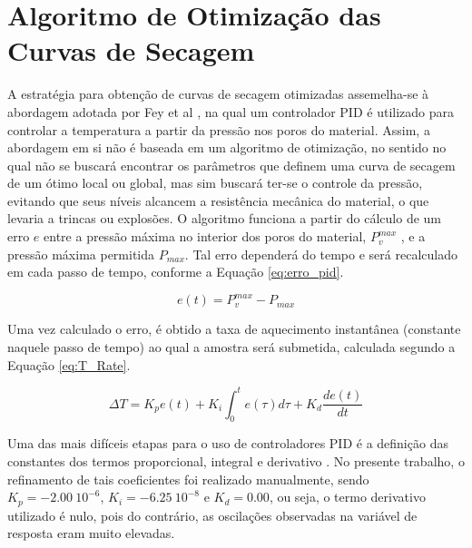 \section{Algoritmo de Otimização das Curvas de Secagem}\label{mat:pid}
A estratégia para obtenção de curvas de secagem otimizadas assemelha-se à
abordagem adotada por Fey et al \cite{Fey2017c}, na qual um controlador PID é
utilizado para controlar a temperatura a partir da pressão nos poros do
material. Assim, a abordagem em si não é baseada em um algoritmo de otimização,
no sentido no qual não se buscará encontrar os parâmetros que definem uma curva
de secagem de um ótimo local ou global, mas sim buscará ter-se o controle da
pressão, evitando que seus níveis alcancem a resistência mecânica do material, o
que levaria a trincas ou explosões. O algoritmo funciona a partir do cálculo de
um erro $e$ entre a pressão máxima no interior dos poros do material,
$P_v^{max}$ , e a pressão máxima permitida $P_{max}$. Tal erro dependerá do
tempo e será recalculado em cada passo de tempo, conforme a Equação
\ref{eq:erro_pid}.

\begin{equation}
  \label{eq:erro_pid}
  e(t) = P_v^{max} - P_{max}
\end{equation}

Uma vez calculado o erro, é obtido a taxa de aquecimento instantânea (constante
naquele passo de tempo) ao qual a amostra será submetida, calculada segundo a
Equação \ref{eq:T_Rate}.

\begin{equation}
  \label{eq:T_Rate}
  \Delta T = K_{p} e(t)+K_{i} \int_{0}^{t} e(\tau) d \tau+K_{d} \frac{d e(t)}{d t}
\end{equation}

Uma das mais difíceis etapas para o uso de controladores PID é a definição das
constantes dos termos proporcional, integral e derivativo \cite{ogata2002}. No
presente trabalho, o refinamento de tais coeficientes foi realizado manualmente,
sendo $K_p = - 2.00 \ 10^{-6}$, $K_i= -6.25 \ 10^{-8}$ e $K_d = 0.00$, ou seja,
o termo derivativo utilizado é nulo, pois do contrário, as oscilações observadas
na variável de resposta eram muito elevadas.
 
  
